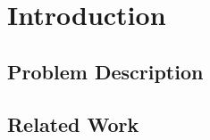 \chapter{Introduction}
\label{cha:introduction}

\section{Problem Description}
\label{sec:problem-description}


\section{Related Work}
\label{sec:related-work}


